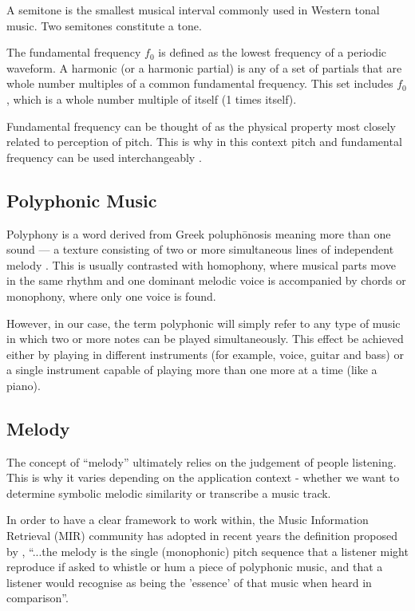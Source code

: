 A semitone is the smallest musical interval commonly used in Western tonal music. Two semitones constitute a tone.

The fundamental frequency $f_{\text{0}}$ is defined as the lowest frequency of a periodic waveform. A harmonic (or a harmonic partial) is any of a set of partials that are whole number multiples of a common fundamental frequency. This set includes $f_{0}$, which is a whole number multiple of itself (1 times itself).

Fundamental frequency can be thought of as the physical property most closely related to perception of pitch. This is why in this context pitch and fundamental frequency can be used interchangeably \cite{salamon}.

\vspace{10pt}

\subsection{Polyphonic Music}

Polyphony is a word derived from Greek poluph\={o}nosis meaning more than one sound — a texture consisting of two or more simultaneous lines of independent melody \cite{polyphonic}. This is usually contrasted with homophony, where musical parts move in the same rhythm and one dominant melodic voice is accompanied by chords or monophony, where only one voice is found. 

However, in our case, the term polyphonic will simply refer to any type of music in which two or more notes can be played simultaneously. This effect be achieved either by playing in different instruments (for example, voice, guitar and bass) or a single instrument capable of playing more than one more at a time (like a piano).

\vspace{10pt}

\subsection{Melody}

The concept of “melody” ultimately relies on the judgement of people listening. This is why it varies depending on the application context - whether we want to determine symbolic melodic similarity or transcribe a music track. 

In order to have a clear framework to work within, the Music Information Retrieval (MIR) community has adopted in recent years the definition proposed by \cite{melodydef}, ``...the melody is the single (monophonic) pitch sequence that a listener might reproduce if asked to whistle or hum a piece of polyphonic music, and that a listener would recognise as being the 'essence' of that music when heard in comparison''.

